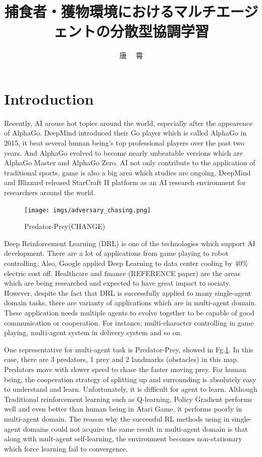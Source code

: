 \documentclass[11pt,twocolumn]{jarticle} %
\title{捕食者・獲物環境におけるマルチエージェントの分散型協調学習}
\author{唐 \ \ 霄}
\begin{document}
\maketitle
\thispagestyle{iitheader}
\section{Introduction}
Recently, AI arouse hot topics around the world, especially after the appearence of AlphaGo\cite{alphago}. DeepMind introduced their Go player which is called AlphaGo in 2015, it beat several human being's top professional players over the past two years. And AlphaGo evolved to become nearly unbeatable versions which are AlphaGo Master and AlphaGo Zero\cite{alphagozero}. AI not only contribute to the application of traditional sports, game is also a big area which studies are ongoing. DeepMind and Blizzard released StarCraft II platform as an AI research environment\cite{starcraft} for researchers around the world.\par

\begin{figure}[t]
 \begin{center}
  \texttt{[image: imgs/adversary\_chasing.png]}
  \caption{Predator-Prey(CHANGE)}
  \label{fig:adversaryChasing}
 \end{center}
\end{figure}

Deep Reinforcement Learning (DRL) is one of the technologies which support AI development. There are a lot of applications from game playing\cite{game} to robot controlling\cite{robot}. Also, Google applied Deep Learning to data center cooling by 40\%\cite{google} electric cost off. Healthcare and finance (REFERENCE paper) are the areas which are being researched and expected to have great impact to sociaty. However, despite the fact that DRL is successfully applied to many single-agent domain tasks, there are varianty of applications which are in multi-agent domain. These application needs multiple agents to evolve together to be capable of good communication or cooperation. For instance, multi-character controlling in game playing, multi-agent system in delivery system and so on.


One representative for multi-agent task is Predator-Prey\cite{maddpg}, showed in Fg.\ref{fig:adversaryChasing}. In this case, there are 3 predators, 1 prey and 2 landmarks (obstacles) in this map. Predators move with slower speed to chase the faster moving prey. For human being, the cooperation strategy of splitting up and surrounding is absolutely easy to understand and learn. Unfortunately, it is difficult for agent to learn. Although Traditional reinforcement learning such as Q-learning\cite{qlearning}, Policy Gradient\cite{pg} performs well and even better than human being in Atari Game\cite{ddpg}, it performs poorly in multi-agent domain. The reason why the successful RL methods using in single-agent domains could not acquire the same result in multi-agent domain is that along with mult-agent self-learning, the environment becomes non-stationary which force learning fail to convergence. \par
\end{document}
